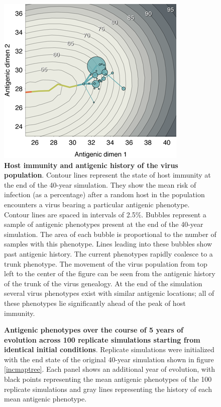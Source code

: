 \begin{figure}[H]
	\centering
	\includegraphics{figures/immunity}
	\caption{\textbf{Host immunity and antigenic history of the virus population}.  Contour lines represent the state of host immunity at the end of the 40-year simulation.  They show the mean risk of infection (as a percentage) after a random host in the population encounters a virus bearing a particular antigenic phenotype.  Contour lines are spaced in intervals of 2.5\%. Bubbles represent a sample of antigenic phenotypes present at the end of the 40-year simulation.  The area of each bubble is proportional to the number of samples with this phenotype.  Lines leading into these bubbles show past antigenic history.  The current phenotypes rapidly coalesce to a trunk phenotype.  The movement of the virus population from top left to the center of the figure can be seen from the antigenic history of the trunk of the virus genealogy. At the end of the simulation several virus phenotypes exist with similar antigenic locations; all of these phenotypes lie significantly ahead of the peak of host immunity.}
	\label{immunity}
\end{figure}

\begin{figure}[H]
	\centering
	\caption{\textbf{Antigenic phenotypes over the course of 5 years of evolution across 100 replicate simulations starting from identical initial conditions}.  Replicate simulations were initialized with the end state of the original 40-year simulation shown in figure \ref{incmaptree}.  Each panel shows an additional year of evolution, with black points representing the mean antigenic phenotypes of the 100 replicate simulations and gray lines representing the history of each mean antigenic phenotype.}
	\label{replicateevol}
\end{figure}


